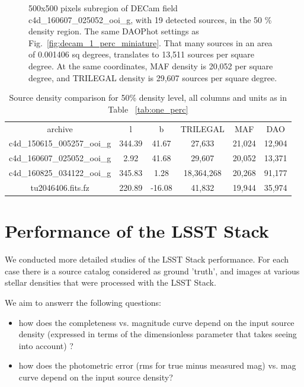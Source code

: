 \documentclass[DM,lsstdraft,toc,usenatbib]{lsstdoc}
\begin{document}
\begin{figure}
\begin{minipage}[t]{0.5\linewidth}
\caption{500x500 pixels subregion of DECam field c4d\_160607\_025052\_ooi\_g,  with 19  detected sources, in the  50 \% density region. The same DAOPhot settings as Fig.~\ref{fig:decam_1_perc_miniature}. That many sources in an area of 0.001406 sq degrees,  translates to 13,511 sources per square degree. At the same coordinates, MAF density is  20,052 per square degree, and TRILEGAL density is 29,607 sources per square degree.}
\label{fig:decam_20_perc_miniature}
\end{minipage}%
\end{figure}


\begin{table}
\begin{tabular}{cccccc}
archive & l & b & TRILEGAL & MAF & DAO \\
c4d\_150615\_005257\_ooi\_g & 344.39 & 41.67 & 27,633 & 21,024 & 12,904 \\
c4d\_160607\_025052\_ooi\_g & 2.92 & 41.68 & 29,607 & 20,052 & 13,371 \\
c4d\_160825\_034122\_ooi\_g & 345.83 & 1.28 & 18,364,268 & 20,268 & 91,177 \\
tu2046406.fits.fz & 220.89 & -16.08 & 41,832 & 19,944 & 35,974 \\
\end{tabular}
\caption{Source density comparison for 50\% density level, all columns and units as in Table ~\ref{tab:one_perc}}
\label{tab:fifty_perc}
\end{table}



\section{Performance of the LSST Stack}
We conducted more detailed studies of the LSST Stack performance. For each case there is a source catalog considered as ground 'truth', and images at various stellar densities that were processed with the LSST Stack. 

We aim to answerr the following questions: 

\begin{itemize}
\item how does the completeness vs. magnitude curve depend on the input source density  (expressed in terms of the dimensionless parameter that takes seeing into account) ? 
\item how does the photometric error (rms for true minus measured mag) vs. mag curve   depend on the input source density?
\end{itemize}
\end{document}
